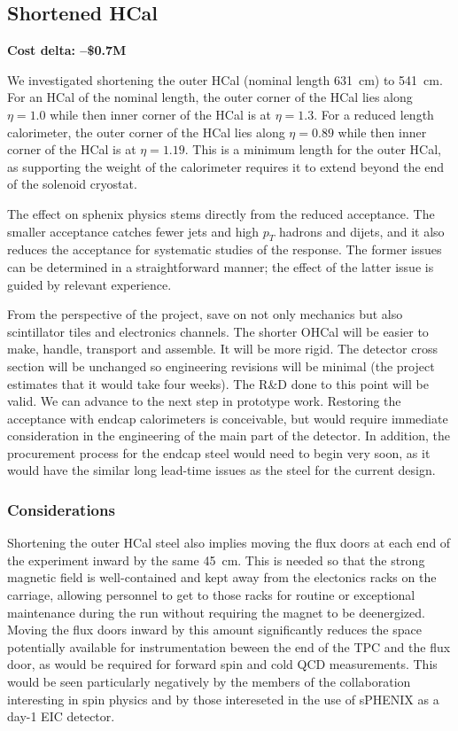 \subsection{Shortened HCal}
\label{ohcal_short}

\textbf{Cost delta: --\$0.7M}
 
We investigated shortening the outer HCal (nominal length 631~cm) to
541~cm.  For an HCal of the nominal length, the outer corner of the
HCal lies along $\eta = 1.0$ while then inner corner of the HCal is at
$\eta = 1.3$.  For a reduced length calorimeter, the outer corner of
the HCal lies along $\eta = 0.89$ while then inner corner of the HCal
is at $\eta = 1.19$.  This is a minimum length for the outer HCal, as
supporting the weight of the calorimeter requires it to extend beyond
the end of the solenoid cryostat.

The effect on sphenix physics stems directly from the reduced
acceptance.  The smaller acceptance catches fewer jets and high $p_T$
hadrons and dijets, and it also reduces the acceptance for systematic
studies of the response.  The former issues can be determined in a
straightforward manner; the effect of the latter issue is guided by
relevant experience.

From the perspective of the project, save on not only mechanics but
also scintillator tiles and electronics channels.  The shorter OHCal
will be easier to make, handle, transport and assemble.  It will be
more rigid.  The detector cross section will be unchanged so
engineering revisions will be minimal (the project estimates that it
would take four weeks). The R\&D done to this point will be valid.  We
can advance to the next step in prototype work.  Restoring the
acceptance with endcap calorimeters is conceivable, but would require
immediate consideration in the engineering of the main part of the
detector.  In addition, the procurement process for the endcap steel
would need to begin very soon, as it would have the similar long
lead-time issues as the steel for the current design.

\subsubsection*{Considerations}

Shortening the outer HCal steel also implies moving the flux doors at
each end of the experiment inward by the same 45~cm.  This is needed
so that the strong magnetic field is well-contained and kept away from
the electonics racks on the carriage, allowing personnel to get to
those racks for routine or exceptional maintenance during the run
without requiring the magnet to be deenergized.  Moving the flux doors
inward by this amount significantly reduces the space potentially
available for instrumentation beween the end of the TPC and the flux
door, as would be required for forward spin and cold QCD measurements.
This would be seen particularly negatively by the members of the
collaboration interesting in spin physics and by those intereseted in
the use of sPHENIX as a day-1 EIC detector.
